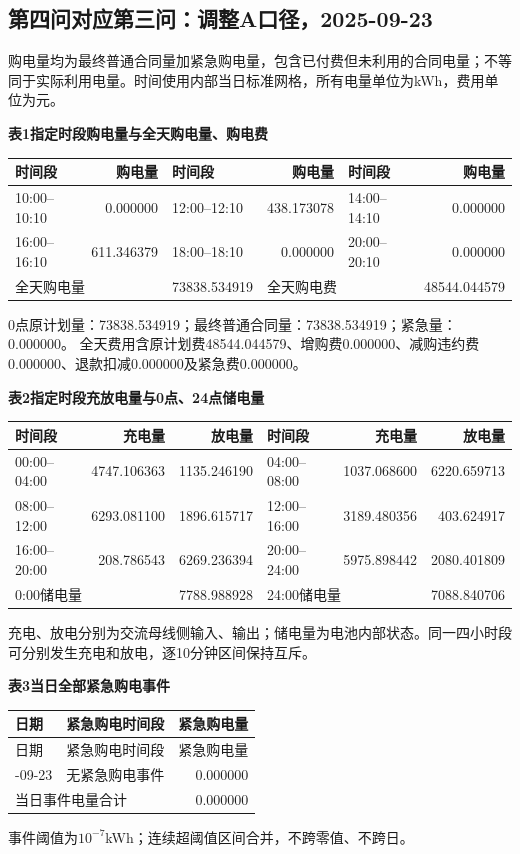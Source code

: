 \subsection{第四问对应第三问：调整A口径，2025-09-23}
\begingroup\small
\setlength{\tabcolsep}{4pt}\renewcommand{\arraystretch}{1.08}
\setlength{\LTpre}{4pt}\setlength{\LTpost}{4pt}
\noindent 购电量均为最终普通合同量加紧急购电量，包含已付费但未利用的合同电量；不等同于实际利用电量。时间使用内部当日标准网格，所有电量单位为kWh，费用单位为元。
\begin{center}\textbf{表1\quad 指定时段购电量与全天购电量、购电费}\par\smallskip
\begin{tabular}{lr lr lr}\toprule
时间段 & 购电量 & 时间段 & 购电量 & 时间段 & 购电量\\\midrule
10:00--10:10 & 0.000000 & 12:00--12:10 & 438.173078 & 14:00--14:10 & 0.000000\\
16:00--16:10 & 611.346379 & 18:00--18:10 & 0.000000 & 20:00--20:10 & 0.000000\\
\midrule
\multicolumn{2}{l}{全天购电量} & 73838.534919 & \multicolumn{2}{l}{全天购电费} & 48544.044579\\
\bottomrule\end{tabular}\end{center}
\noindent 0点原计划量：73838.534919；最终普通合同量：73838.534919；紧急量：0.000000。
全天费用含原计划费48544.044579、增购费0.000000、减购违约费0.000000、退款扣减0.000000及紧急费0.000000。
\begin{center}\textbf{表2\quad 指定时段充放电量与0点、24点储电量}\par\smallskip
\begin{tabular}{lrr lrr}\toprule
时间段 & 充电量 & 放电量 & 时间段 & 充电量 & 放电量\\\midrule
00:00--04:00 & 4747.106363 & 1135.246190 & 04:00--08:00 & 1037.068600 & 6220.659713\\
08:00--12:00 & 6293.081100 & 1896.615717 & 12:00--16:00 & 3189.480356 & 403.624917\\
16:00--20:00 & 208.786543 & 6269.236394 & 20:00--24:00 & 5975.898442 & 2080.401809\\
\midrule
\multicolumn{2}{l}{0:00储电量} & 7788.988928 & \multicolumn{2}{l}{24:00储电量} & 7088.840706\\
\bottomrule\end{tabular}\end{center}
\noindent 充电、放电分别为交流母线侧输入、输出；储电量为电池内部状态。同一四小时段可分别发生充电和放电，逐10分钟区间保持互斥。
\begin{center}\textbf{表3\quad 当日全部紧急购电事件}\end{center}
\begin{longtable}{llr}\toprule 日期 & 紧急购电时间段 & 紧急购电量\\\midrule\endfirsthead
\toprule 日期 & 紧急购电时间段 & 紧急购电量\\\midrule\endhead
\bottomrule\endfoot
2025-09-23 & 无紧急购电事件 & 0.000000\\
\midrule\multicolumn{2}{l}{当日事件电量合计} & 0.000000\\
\end{longtable}
\noindent 事件阈值为$10^{-7}$kWh；连续超阈值区间合并，不跨零值、不跨日。
\endgroup
\clearpage

